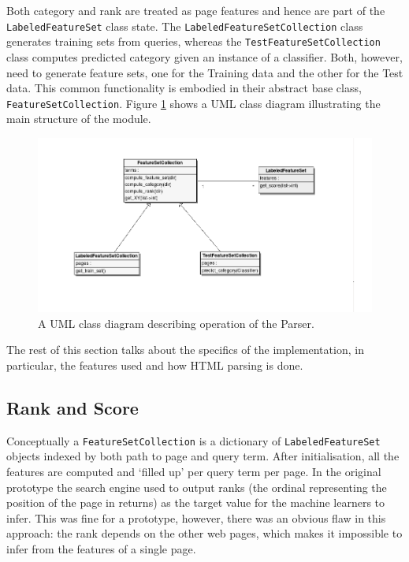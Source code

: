 \documentclass[12pt,notitlepage,twoside]{scrreprt}
\begin{document}
Both category and rank are
treated as page features and hence are part of the \texttt{LabeledFeatureSet}
class state.  The \texttt{LabeledFeatureSetCollection} class generates training
sets from queries, whereas the \texttt{TestFeatureSetCollection} class computes
predicted category given an instance of a classifier. Both, however, need to
generate feature sets, one for the Training data and the other for the Test
data. This common functionality is embodied in their abstract base class,
\texttt{FeatureSetCollection}.  Figure \ref{uml} shows a UML class diagram
illustrating the main structure of the module.

\begin{figure}[h!]
\centering
\includegraphics[scale=0.5]{figs/uml.png}
\caption{A UML class diagram describing operation of the Parser.}
\label{uml}
\end{figure}

The rest of this section talks about the specifics of the implementation, in
particular, the features used and how HTML parsing is done.

\subsection{Rank and Score}
Conceptually a \texttt{FeatureSetCollection} is a dictionary of \texttt{LabeledFeatureSet}
objects indexed by both path to page and query term. After initialisation, all
the features are computed and `filled up' per query term per page.
In the original prototype the search engine used to output ranks (the ordinal representing the position of the
page in returns) as the target value for the machine learners to infer. This was fine for
a prototype, however, there was an obvious flaw in this approach: the rank depends
on the other web pages, which makes it impossible to infer from the features of a single
page. 
\end{document}
